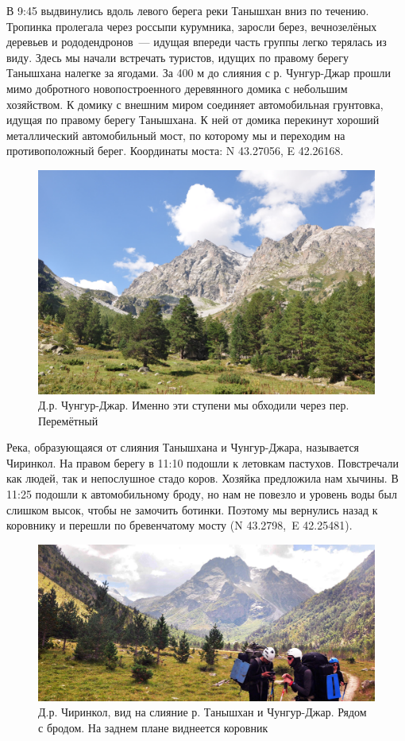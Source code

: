  В 9:45 выдвинулись вдоль левого берега реки Танышхан вниз по течению. Тропинка пролегала через россыпи курумника, заросли берез, вечнозелёных деревьев  и рододендронов~--- идущая впереди часть группы легко терялась из виду. Здесь мы начали встречать туристов, идущих по правому берегу Танышхана налегке за ягодами. За 400 м до слияния с р. Чунгур-Джар прошли мимо добротного новопостроенного деревянного домика с небольшим хозяйством. К домику с внешним миром соединяет автомобильная грунтовка, идущая по правому берегу Танышхана. К ней от домика перекинут хороший металлический автомобильный мост, по которому мы и переходим на противоположный берег. Координаты моста: N 43.27056\degree, E 42.26168\degree. 
 
\begin{figure}[h!]
	\centering
	\includegraphics[width=0.7\linewidth]{../pics/DSC_0459 2}
	\caption{Д.р. Чунгур-Джар. Именно эти ступени мы обходили через пер. Перемётный}
	\label{fig:DSC_0459}
\end{figure}

Река, образующаяся от слияния Танышхана и Чунгур-Джара, называется Чиринкол. На правом берегу в 11:10 подошли к летовкам пастухов. Повстречали как людей, так и непослушное стадо коров. Хозяйка предложила нам хычины. В 11:25 подошли к автомобильному броду, но нам не повезло и уровень воды был слишком высок, чтобы не замочить ботинки. Поэтому мы вернулись назад к коровнику и перешли по бревенчатому мосту (N 43.2798\degree,~E 42.25481\degree).

\begin{figure}[h!]
	\centering
	\includegraphics[width=0.7\linewidth]{../pics/DSC_0462 2}
	\caption{Д.р. Чиринкол, вид на слияние р. Танышхан и Чунгур-Джар. Рядом с бродом. На заднем плане виднеется коровник}
	\label{fig:DSC_0462}
\end{figure}

